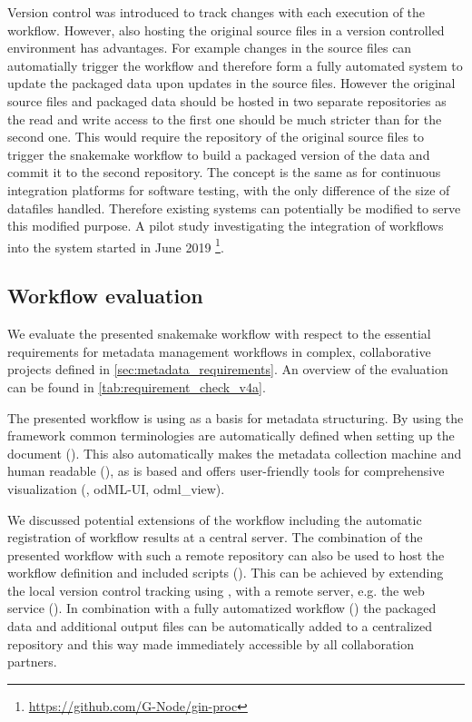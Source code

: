 Version control was introduced to track changes with each execution of the workflow. However, also hosting the original source files in a version controlled environment has advantages. For example changes in the source files can automatially trigger the workflow and therefore form a fully automated system to update the packaged data upon updates in the source files. However the original source files and packaged data should be hosted in two separate repositories as the read and write access to the first one should be much stricter than for the second one. This would require the repository of the original source files to trigger the snakemake workflow to build a packaged version of the data and commit it to the second repository. The concept is the same as for continuous integration platforms for software testing, with the only difference of the size of datafiles handled. Therefore existing systems can potentially be modified to serve this modified purpose. A pilot study investigating the integration of  workflows into the  system started in June 2019 \footnote{\url{https://github.com/G-Node/gin-proc}}.


\subsection{Workflow evaluation}
We evaluate the presented snakemake workflow with respect to the essential requirements for metadata management workflows in complex, collaborative projects defined in \cref{sec:metadata_requirements}. An overview of the evaluation can be found in \cref{tab:requirement_check_v4a}.

The presented workflow is using  as a basis for metadata structuring. By using the  framework common terminologies are automatically defined when setting up the  document (). This also automatically makes the metadata collection machine and human readable (), as  is  based and offers user-friendly tools for comprehensive visualization (, odML-UI, odml\_view).

We discussed potential extensions of the workflow including the automatic registration of workflow results at a central server. The combination of the presented workflow with such a remote repository can also be used to host the workflow definition and included scripts (). This can be achieved by extending the local version control tracking using ,  with a remote server, e.g. the  web service (). In combination with a fully automatized workflow () the packaged data and additional output files can be automatically added to a centralized repository and this way made immediately accessible by all collaboration partners.

